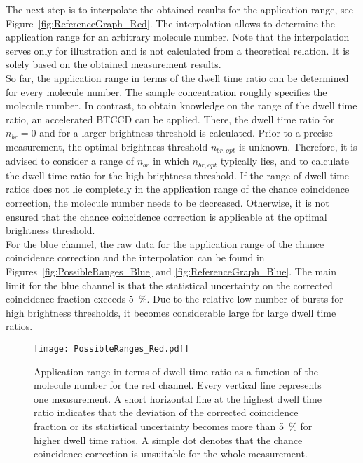 The next step is to interpolate the obtained results for the application range, see Figure~\ref{fig:ReferenceGraph_Red}. The interpolation allows to determine the application range for an arbitrary molecule number. Note that the interpolation serves only for illustration and is not calculated from a theoretical relation. It is solely based on the obtained measurement results.\\

So far, the application range in terms of the dwell time ratio can be determined for every molecule number. The sample concentration roughly specifies the molecule number. In contrast, to obtain knowledge on the range of the dwell time ratio, an accelerated \gls{BTCCD} can be applied. There, the dwell time ratio for $n_{br} = 0$ and for a larger brightness threshold is calculated. Prior to a precise measurement, the optimal brightness threshold $n_{br,opt}$ is unknown. Therefore, it is advised to consider a range of $n_{br}$ in which $n_{br,opt}$ typically lies, and to calculate the dwell time ratio for the high brightness threshold. If the range of dwell time ratios does not lie completely in the application range of the chance coincidence correction, the molecule number needs to be decreased. Otherwise, it is not ensured that the chance coincidence correction is applicable at the optimal brightness threshold. \\

For the blue channel, the raw data for the application range of the chance coincidence correction and the interpolation can be found in Figures~\ref{fig:PossibleRanges_Blue} and \ref{fig:ReferenceGraph_Blue}. The main limit for the blue channel is that the statistical uncertainty on the corrected coincidence fraction exceeds \SI{5}{\percent}. Due to the relative low number of bursts for high brightness thresholds, it becomes considerable large for large dwell time ratios.

\vfill
\begin{figure}[h!]
	\centering
	\texttt{[image: PossibleRanges\_Red.pdf]}
	\caption[Application range of chance coincidence correction for red channel for measurements with \gls{dsDNA} and ribosomes]{Application range in terms of dwell time ratio as a function of the molecule number for the red channel. Every vertical line represents one measurement. A short horizontal line at the highest dwell time ratio indicates that the deviation of the corrected coincidence fraction or its statistical uncertainty becomes more than \SI{5}{\percent} for higher dwell time ratios. A simple dot denotes that the chance coincidence correction is unsuitable for the whole measurement.}
	\label{fig:PossibleRanges_Red}
\end{figure}
\vfill

